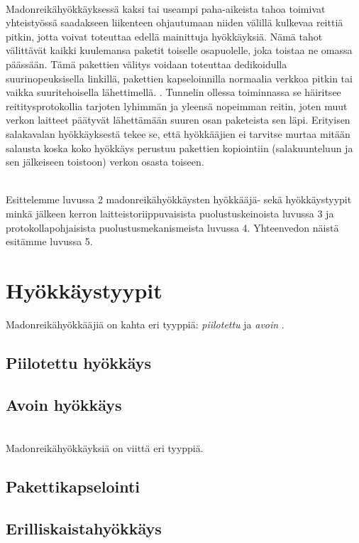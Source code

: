 \documentclass[finnish]{tktltiki2}
\theoremstyle{definition}
\theoremstyle{remark}
\begin{document}
\noindent \\
Madonreikähyökkäyksessä kaksi tai useampi paha-aikeista tahoa toimivat yhteistyössä saadakseen liikenteen ohjautumaan niiden välillä kulkevaa reittiä pitkin, jotta voivat toteuttaa edellä mainittuja hyökkäyksiä. Nämä tahot välittävät kaikki kuulemansa paketit toiselle osapuolelle, joka toistaa ne omassa päässään. Tämä pakettien välitys voidaan toteuttaa dedikoidulla suurinopeuksisella linkillä, pakettien kapseloinnilla normaalia verkkoa pitkin tai vaikka suuritehoisella lähettimellä. \cite{liteworp}. Tunnelin ollessa toiminnassa se häiritsee reititysprotokollia tarjoten lyhimmän ja yleensä nopeimman reitin, joten muut verkon laitteet päätyvät lähettämään suuren osan paketeista sen läpi. Erityisen salakavalan hyökkäyksestä tekee se, että hyökkääjien ei tarvitse murtaa mitään salausta koska koko hyökkäys perustuu pakettien kopiointiin (salakuunteluun ja sen jälkeiseen toistoon) verkon osasta toiseen.

\noindent \\
Esittelemme luvussa 2 madonreikähyökkäysten hyökkääjä- \cite{delphi} sekä hyökkäystyypit \cite{liteworp} minkä jälkeen kerron laitteistoriippuvaisista puolustuskeinoista luvussa 3 ja protokollapohjaisista puolustusmekanismeista luvussa 4. Yhteenvedon näistä esitämme luvussa 5.

\section{Hyökkäystyypit}

Madonreikähyökkääjiä on kahta eri tyyppiä: \emph{piilotettu} ja \emph{avoin} \cite{delphi}.

\subsection{Piilotettu hyökkäys}
\subsection{Avoin hyökkäys}

\noindent \\
Madonreikähyökkäyksiä on viittä eri tyyppiä. \cite[s. 3-4]{liteworp}

\subsection{Pakettikapselointi}
\subsection{Erilliskaistahyökkäys}
\end{document}
